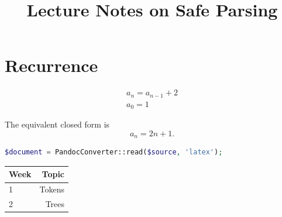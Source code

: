 \documentclass{article}
\title{Lecture Notes on Safe Parsing}
\begin{document}
\section{Recurrence}\label{sec:recurrence}
\begin{gather}
  a_n = a_{n-1} + 2 \\
  a_0 = 1
\end{gather}

The equivalent closed form is
\[
  a_n = 2n + 1.
\]

\begin{lstlisting}[language=PHP]
$document = PandocConverter::read($source, 'latex');
\end{lstlisting}

\begin{longtable}{lr}
  \toprule
  Week & Topic \\
  \midrule
  1 & Tokens \\
  2 & Trees \\
  \bottomrule
\end{longtable}
\end{document}
